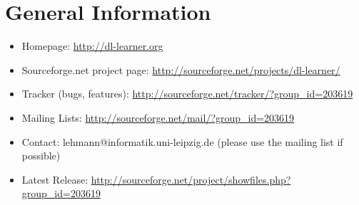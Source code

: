 \documentclass[a4paper,12pt]{scrartcl}
\begin{document}
\section{General Information}
\label{sec:general}
\label{sec:contact}

\begin{itemize}
 \item Homepage: \url{http://dl-learner.org}
 \item Sourceforge.net project page: \url{http://sourceforge.net/projects/dl-learner/}
 \item Tracker (bugs, features): \url{http://sourceforge.net/tracker/?group_id=203619}
 \item Mailing Lists: \url{http://sourceforge.net/mail/?group_id=203619}
 \item Contact: lehmann@informatik.uni-leipzig.de (please use the mailing list if possible)
 \item Latest Release: \url{http://sourceforge.net/project/showfiles.php?group_id=203619}
\end{itemize}

\nocite{*}


\end{document}
